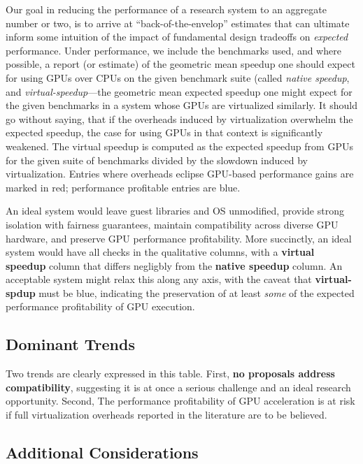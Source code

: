 Our goal in reducing the performance of a research system to an aggregate number or two, is to arrive at ``back-of-the-envelop'' estimates that can ultimate inform some intuition of the impact of fundamental design tradeoffs on {\it expected} performance. Under performance, we include the benchmarks used, and where possible, a report (or estimate) of the geometric mean speedup one should expect for using GPUs over CPUs on the given benchmark suite (called \emph{native speedup}, and \emph{virtual-speedup}---the geometric mean expected speedup one might expect for the given benchmarks in a system whose GPUs are virtualized similarly. It should go without saying, that if the overheads induced by virtualization overwhelm the expected speedup, the case for using GPUs in that context is significantly weakened.
The virtual speedup is computed as the expected speedup from GPUs for the given suite of benchmarks divided by the slowdown induced by virtualization. Entries where overheads eclipse GPU-based performance gains are marked in red; performance profitable entries are blue.

An ideal system would leave guest libraries and OS unmodified, provide strong
isolation with fairness guarantees, maintain compatibility across diverse GPU
hardware, and preserve GPU performance profitability. More succinctly, an
ideal system would have all checks in the qualitative columns, with a {\bf
virtual speedup} column that differs negligbly from the {\bf native speedup}
column. An acceptable system might relax this along any axis, with the caveat
that {\bf virtual-spdup} must be blue, indicating the preservation of at least
{\it some} of the expected performance profitability of GPU execution.

\subsection{Dominant Trends}

Two trends are clearly expressed in this table. First, {\bf no proposals
address compatibility}, suggesting it is at once a serious challenge and an
ideal research opportunity. Second, The performance profitability of GPU
acceleration is at risk if full virtualization overheads reported in the
literature are to be believed.

\subsection{Additional Considerations}

